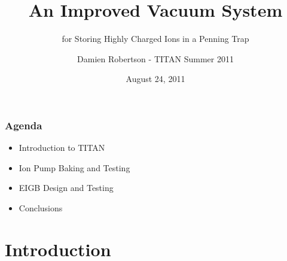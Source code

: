 \documentclass{beamer}
\title{An Improved Vacuum System}
\subtitle{\Large{for Storing Highly Charged Ions in a Penning Trap}}
\author{Damien Robertson - TITAN Summer 2011}
\date{August 24, 2011}
\begin{document}
\frame
{
\titlepage
}

\frame
{
  \frametitle{Agenda}
  \begin{itemize}
  \item<1> Introduction to TITAN
  \item<1> Ion Pump Baking and Testing
  \item<1> EIGB Design and Testing
  \item<1> Conclusions
  \end{itemize}
}
\section{Introduction}
\end{document}
